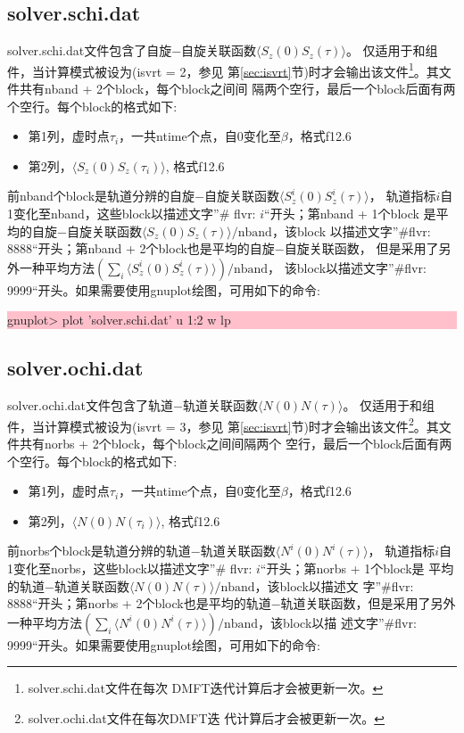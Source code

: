 \subsection{solver.schi.dat}
solver.schi.dat文件包含了自旋$-$自旋关联函数$\langle S_{z}(0)S_{z}(\tau) \rangle$。
仅适用于{\gardenia}和{\narcissus}组件，当计算模式被设为(isvrt = 2，参见
第\ref{sec:isvrt}节)时才会输出该文件\footnote{solver.schi.dat文件在每次
DMFT迭代计算后才会被更新一次。}。其文件共有nband + 2个block，每个block之间间
隔两个空行，最后一个block后面有两个空行。每个block的格式如下:
\begin{itemize}
  \item 第1列，虚时点$\tau_{i}$，一共ntime个点，自0变化至$\beta$，格式f12.6
  \item 第2列，$\langle S_{z}(0)S_{z}(\tau_{i}) \rangle$, 格式f12.6
\end{itemize}
前nband个block是轨道分辨的自旋$-$自旋关联函数$\langle S_{z}^{i}(0)S_{z}^{i}(\tau) \rangle$，
轨道指标$i$自1变化至nband，这些block以描述文字”\# flvr: $i$“开头；第nband + 1个block
是平均的自旋$-$自旋关联函数$\langle S_{z}(0)S_{z}(\tau) \rangle/\text{nband}$，该block
以描述文字”\#flvr: 8888“开头；第nband + 2个block也是平均的自旋$-$自旋关联函数，
但是采用了另外一种平均方法$(\sum_{i} \langle S_{z}^{i}(0)S_{z}^{i}(\tau) \rangle)/\text{nband}$，
该block以描述文字”\#flvr: 9999“开头。如果需要使用gnuplot绘图，可用如下的命令:

\noindent\colorbox{pink}{\parbox[r]{\linewidth}{\quad gnuplot> plot 'solver.schi.dat' u 1:2 w lp }}

\subsection{solver.ochi.dat}
solver.ochi.dat文件包含了轨道$-$轨道关联函数$\langle N(0) N(\tau) \rangle$。
仅适用于{\gardenia}和{\narcissus}组件，当计算模式被设为(isvrt = 3，参见
第\ref{sec:isvrt}节)时才会输出该文件\footnote{solver.ochi.dat文件在每次DMFT迭
代计算后才会被更新一次。}。其文件共有norbs + 2个block，每个block之间间隔两个
空行，最后一个block后面有两个空行。每个block的格式如下:
\begin{itemize}
  \item 第1列，虚时点$\tau_{i}$，一共ntime个点，自0变化至$\beta$，格式f12.6
  \item 第2列，$\langle N(0) N(\tau_{i}) \rangle$, 格式f12.6
\end{itemize}
前norbs个block是轨道分辨的轨道$-$轨道关联函数$\langle N^{i}(0) N^{i}(\tau) \rangle$，
轨道指标$i$自1变化至norbs，这些block以描述文字”\# flvr: $i$“开头；第norbs + 1个block是
平均的轨道$-$轨道关联函数$\langle N(0) N(\tau) \rangle/\text{nband}$，该block以描述文
字”\#flvr: 8888“开头；第norbs + 2个block也是平均的轨道$-$轨道关联函数，但是采用了另外
一种平均方法$(\sum_{i} \langle N^{i}(0)N^{i}(\tau) \rangle)/\text{nband}$，该block以描
述文字”\#flvr: 9999“开头。如果需要使用gnuplot绘图，可用如下的命令:

